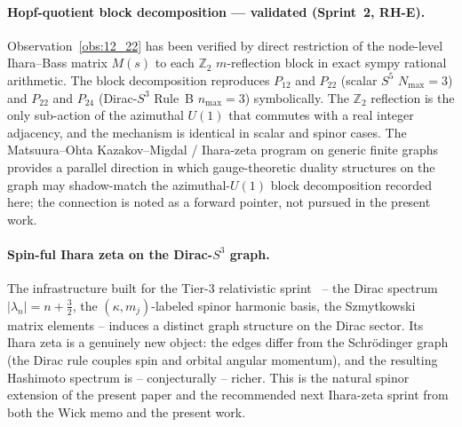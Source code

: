 \documentclass[11pt]{article}
\begin{document}
\paragraph{Hopf-quotient block decomposition --- validated (Sprint~2, RH-E).}
Observation~\ref{obs:12_22} has been verified by direct restriction of
the node-level Ihara--Bass matrix $M(s)$ to each $\mathbb{Z}_2$
$m$-reflection block in exact sympy rational arithmetic.  The block
decomposition reproduces $P_{12}$ and $P_{22}$ (scalar $S^5$
$N_{\max}=3$) and $P_{22}$ and $P_{24}$ (Dirac-$S^3$ Rule~B
$n_{\max}=3$) symbolically.  The $\mathbb{Z}_2$ reflection is the only
sub-action of the azimuthal $U(1)$ that commutes with a real
integer adjacency, and the mechanism is identical in scalar and spinor
cases.  The Matsuura--Ohta Kazakov--Migdal / Ihara-zeta program on
generic finite graphs~\cite{matsuura2025,matsuura_ohta2024_phases}
provides a parallel direction in which gauge-theoretic duality
structures on the graph may shadow-match the azimuthal-$U(1)$ block
decomposition recorded here; the connection is noted as a forward
pointer, not pursued in the present work.

\paragraph{Spin-ful Ihara zeta on the Dirac-$S^3$ graph.}  The
infrastructure built for the Tier-3 relativistic
sprint~\cite{paper14,paper18} -- the Dirac spectrum $|\lambda_n|=n+\tfrac32$,
the $(\kappa, m_j)$-labeled spinor harmonic basis, the
Szmytkowski matrix elements -- induces a distinct graph structure
on the Dirac sector.  Its Ihara zeta is a genuinely new object:
the edges differ from the Schr\"odinger graph (the Dirac rule
couples spin and orbital angular momentum), and the resulting Hashimoto
spectrum is -- conjecturally -- richer.  This is the natural spinor
extension of the present paper and the recommended next Ihara-zeta
sprint from both the Wick memo and the present work.
\end{document}
